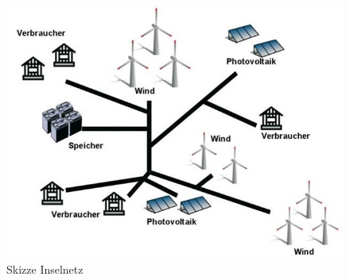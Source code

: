 \begin{figure}[h!]
    \centering
    \includegraphics[width=14cm]{Abbildungen/StandDerTechnikAbb1.jpg}
    \caption{Skizze Inselnetz\cite{forwind}}\label{fig:Skizze_Inselnetz}
\end{figure}

